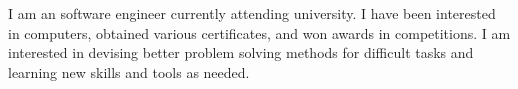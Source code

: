 

\begin{cvparagraph}

I am an software engineer currently attending university. I have been interested in computers, obtained various certificates, and won awards in competitions. I am interested in devising better problem solving methods for difficult tasks and learning new skills and tools as needed.
\end{cvparagraph}
